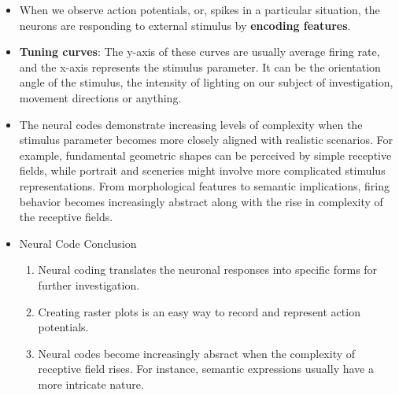 \documentclass[11pt]{article}
\begin{document}
\begin{itemize}
\begin{center}
    \end{center}
    \item When we observe action potentials, or, spikes in a particular situation, the neurons are responding to external stimulus by \textbf{encoding features}. 
    \item \textbf{Tuning curves}: The y-axis of these curves are usually average firing rate, and the x-axis represents the stimulus parameter. It can be the orientation angle of the stimulus, the intensity of lighting on our subject of investigation, movement directions or anything.
    \item The neural codes demonstrate increasing levels of complexity when the stimulus parameter becomes more closely aligned with realistic scenarios. For example, fundamental geometric shapes can be perceived by simple receptive fields, while portrait and sceneries might involve more complicated stimulus representations. From morphological features to semantic implications, firing behavior becomes increasingly abstract along with the rise in complexity of the receptive fields.
    \item Neural Code Conclusion
    \begin{enumerate}
        \item Neural coding translates the neuronal responses into specific forms for further investigation.
        \item Creating raster plots is an easy way to record and represent action potentials. 
        \item Neural codes become increasingly absract when the complexity of receptive field rises. For instance, semantic expressions usually have a more intricate nature.
    \end{enumerate}
\end{itemize}
\end{document}
